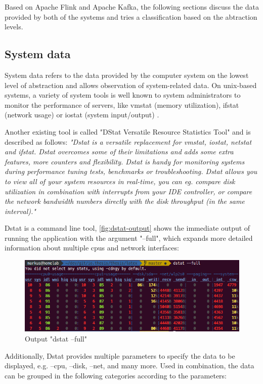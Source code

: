 Based on Apache Flink and Apache Kafka, the following sections discuss the data provided
by both of the systems and tries a classification based on the abtraction levels.

\subsection{System data}
\label{sec:system-data}
System data refers to the data provided by the computer system on the lowest level of
abstraction and allows observation of system-related data. On unix-based systems, a
variety of system tools is well known to system administrators to monitor the performance
of servers, like vmstat (memory utilization), ifstat (network usage) or iostat (system
input/output) \cite{Hoeb12}.

Another existing tool is called "DStat Versatile Resource Statistics Tool" and is described
as follows: \textit{"Dstat is a versatile replacement for vmstat, iostat, netstat and ifstat. Dstat
overcomes some of their limitations and adds some extra features, more counters and flexibility.
Dstat is handy for monitoring systems during performance tuning tests, benchmarks
or troubleshooting. Dstat allows you to view all of your system resources in real-time, you
can eg. compare disk utilization in combination with interrupts from your IDE controller,
or compare the network bandwidth numbers directly with the disk throughput (in the same
interval)."}\cite{Wieers16}

Dstat is a command line tool, \autoref{fig:dstat-output} shows the immediate output of running
the application with the argument "--full", which expands more detailed information about
multiple cpus and network interfaces:

\begin{figure}[H]
	\centering
	\includegraphics[width=1.0\textwidth]{../images/06-dstat-full.png}
	\caption{Output "dstat --full"}
	\label{fig:dstat-output}
\end{figure}

Additionally, Dstat provides multiple parameters to specify the data to be displayed, e.g.
--cpu, --disk, --net, and many more. Used in combination, the data can be grouped in the
following categories according to the parameters:

